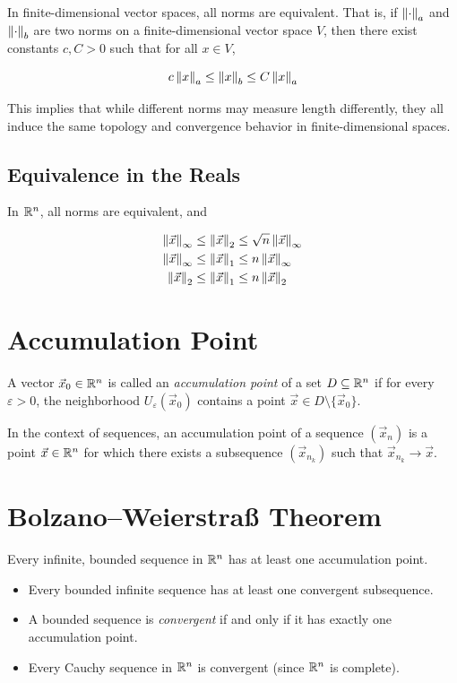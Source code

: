 In finite-dimensional vector spaces, all norms are equivalent. That is, if \( \left\| \cdot \right\|_a \) and 
\( \left\| \cdot \right\|_b \) are two norms on a finite-dimensional vector space \( V \), then there exist constants 
\( c, C > 0 \) such that for all \( x \in V \),

\[
    c \left\| x \right\|_a \leq \left\| x \right\|_b \leq C \left\| x \right\|_a
\]

This implies that while different norms may measure length differently, they all 
induce the same topology and convergence behavior in finite-dimensional spaces.

\subsection{Equivalence in the Reals}

In \(\mathbb{R}^n\), all norms are equivalent, and

\begin{align*}
     \left\| \vec{x} \right\|_\infty &\le \left\| \vec{x} \right\|_2 \le \sqrt{n}\left\| \vec{x} \right\|_\infty \\
     \left\| \vec{x} \right\|_\infty &\le \left\| \vec{x} \right\|_1 \le n\left\| \vec{x} \right\|_\infty \\
     \left\| \vec{x} \right\|_2 &\le \left\| \vec{x} \right\|_1 \le n\left\| \vec{x} \right\|_2
\end{align*}

\section{Accumulation Point}

A vector \( \vec{x}_0 \in \mathbb{R}^n \) is called an \emph{accumulation point} of a set 
\( D \subseteq \mathbb{R}^n \) if for every \( \varepsilon > 0 \), the neighborhood 
\( U_\varepsilon(\vec{x}_0) \) contains a point \( \vec{x} \in D \setminus \{\vec{x}_0\} \).

In the context of sequences, an accumulation point of a sequence \( (\vec{x}_n) \) is a point 
\( \vec{x} \in \mathbb{R}^n \) for which there exists a subsequence \( (\vec{x}_{n_k}) \) such that 
\( \vec{x}_{n_k} \to \vec{x} \).

\section{Bolzano–Weierstraß Theorem}

Every infinite, bounded sequence in \( \mathbb{R}^n \) has at least one accumulation point.

\begin{itemize}
    
    \item Every bounded infinite sequence has at least one convergent subsequence.

    \item A bounded sequence is \emph{convergent} if and only if it has exactly one accumulation point.

    \item Every Cauchy sequence in \( \mathbb{R}^n \) is convergent (since \( \mathbb{R}^n \) is complete).

\end{itemize}

